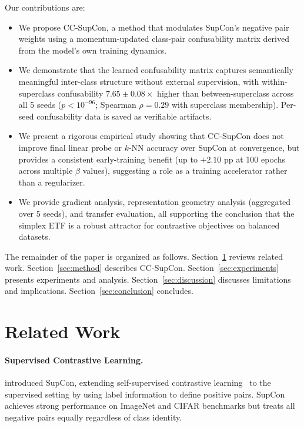\documentclass{article}
\begin{document}
Our contributions are:
\begin{itemize}
    \item We propose CC-SupCon, a method that modulates SupCon's negative pair weights using a momentum-updated class-pair confusability matrix derived from the model's own training dynamics.
    \item We demonstrate that the learned confusability matrix captures semantically meaningful inter-class structure without external supervision, with within-superclass confusability $7.65 \pm 0.08\times$ higher than between-superclass across all 5 seeds ($p < 10^{-96}$; Spearman $\rho = 0.29$ with superclass membership). Per-seed confusability data is saved as verifiable artifacts.
    \item We present a rigorous empirical study showing that CC-SupCon does not improve final linear probe or $k$-NN accuracy over SupCon at convergence, but provides a consistent early-training benefit (up to $+2.10$ pp at 100 epochs across multiple $\beta$ values), suggesting a role as a training accelerator rather than a regularizer.
    \item We provide gradient analysis, representation geometry analysis (aggregated over 5 seeds), and transfer evaluation, all supporting the conclusion that the simplex ETF is a robust attractor for contrastive objectives on balanced datasets.
\end{itemize}

The remainder of the paper is organized as follows. Section~\ref{sec:related} reviews related work. Section~\ref{sec:method} describes CC-SupCon. Section~\ref{sec:experiments} presents experiments and analysis. Section~\ref{sec:discussion} discusses limitations and implications. Section~\ref{sec:conclusion} concludes.


\section{Related Work}
\label{sec:related}

\paragraph{Supervised Contrastive Learning.}
\citet{khosla2020supervised} introduced SupCon, extending self-supervised contrastive learning~\citep{chen2020simple} to the supervised setting by using label information to define positive pairs. SupCon achieves strong performance on ImageNet and CIFAR benchmarks but treats all negative pairs equally regardless of class identity.
\end{document}
